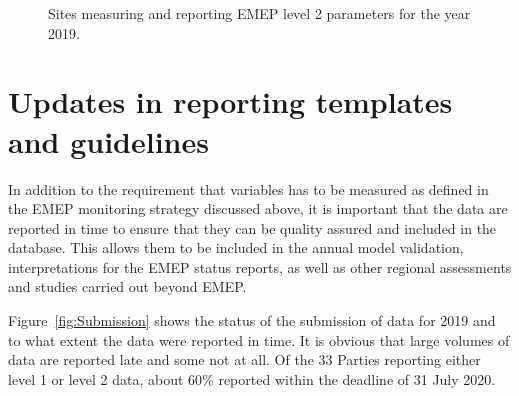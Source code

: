 \begin{figure}[h!]
 \centering
\caption{\label{fig:levell2-sites}Sites measuring and reporting EMEP level 2 parameters for the year 2019.}
\end{figure}

\section{Updates in reporting templates and guidelines}

In addition to the requirement that variables has to be measured as defined in the EMEP monitoring 
strategy discussed above, it is important that the data are reported in time to ensure that they can 
be quality assured and included in the database. This allows them to be included in the annual model 
validation, interpretations for the EMEP status reports, as well as other regional assessments and 
studies carried out beyond EMEP.

Figure~\ref{fig:Submission} shows the status of the submission of data for 2019  and to what  extent the data were reported in time. It is obvious that large volumes of data are reported late and some not at all. Of the 33 Parties reporting either level 1 or level 2 data, about  60\% reported within the deadline of 31 July 2020. 

